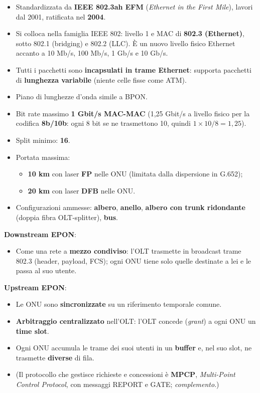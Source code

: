\begin{itemize}
\tightlist
\item
  Standardizzata da \textbf{IEEE 802.3ah EFM} (\emph{Ethernet in the First Mile}), lavori dal 2001, ratificata nel \textbf{2004}.
\item
  Si colloca nella famiglia IEEE 802: livello 1 e MAC di \textbf{802.3 (Ethernet)}, sotto 802.1 (bridging) e 802.2 (LLC). È un nuovo livello fisico Ethernet accanto a 10 Mb/s, 100 Mb/s, 1 Gb/s e 10 Gb/s.
\item
  Tutti i pacchetti sono \textbf{incapsulati in trame Ethernet}: supporta pacchetti di \textbf{lunghezza variabile} (niente celle fisse come ATM).
\item
  Piano di lunghezze d'onda simile a BPON.
\item
  Bit rate massimo \textbf{1 Gbit/s MAC-MAC} (1,25 Gbit/s a livello fisico per la codifica \textbf{8b/10b}: ogni 8 bit se ne trasmettono 10, quindi \(1 \times 10/8 = 1{,}25\)).
\item
  Split minimo: \textbf{16}.
\item
  Portata massima:

  \begin{itemize}
  \tightlist
  \item
    \textbf{10 km} con laser \textbf{FP} nelle ONU (limitata dalla dispersione in G.652);
  \item
    \textbf{20 km} con laser \textbf{DFB} nelle ONU.
  \end{itemize}
\item
  Configurazioni ammesse: \textbf{albero}, \textbf{anello}, \textbf{albero con trunk ridondante} (doppia fibra OLT-splitter), \textbf{bus}.
\end{itemize}

\textbf{Downstream EPON}:

\begin{itemize}
\tightlist
\item
  Come una rete a \textbf{mezzo condiviso}: l'OLT trasmette in broadcast trame 802.3 (header, payload, FCS); ogni ONU tiene solo quelle destinate a lei e le passa al suo utente.
\end{itemize}

\textbf{Upstream EPON}:

\begin{itemize}
\tightlist
\item
  Le ONU sono \textbf{sincronizzate} su un riferimento temporale comune.
\item
  \textbf{Arbitraggio centralizzato} nell'OLT: l'OLT concede (\emph{grant}) a ogni ONU un \textbf{time slot}.
\item
  Ogni ONU accumula le trame dei suoi utenti in un \textbf{buffer} e, nel suo slot, ne trasmette \textbf{diverse} di fila.
\item
  (Il protocollo che gestisce richieste e concessioni è \textbf{MPCP}, \emph{Multi-Point Control Protocol}, con messaggi REPORT e GATE; \emph{complemento}.)
\end{itemize}

